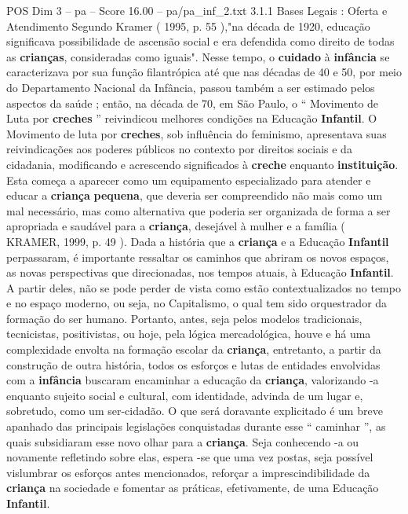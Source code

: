 \begin{textsample}{POS Dim 3 – pa – Score 16.00 – pa/pa\_inf\_2.txt}  \label{ex:f3_pos_234}
3.1.1 Bases Legais : Oferta e Atendimento Segundo Kramer ( 1995, p. 55 ),"na década de 1920, educação significava possibilidade de ascensão social e era defendida como direito de todas as \textbf{crianças}, consideradas como iguais".
Nesse tempo, o \textbf{cuidado} à \textbf{infância} se caracterizava por sua função filantrópica até que nas décadas de 40 e 50, por meio do Departamento Nacional da Infância, passou também a ser estimado pelos aspectos da saúde ; então, na década de 70, em São Paulo, o “ Movimento de Luta por \textbf{creches} ” reivindicou melhores condições na Educação \textbf{Infantil}.
O Movimento de luta por \textbf{creches}, sob influência do feminismo, apresentava suas reivindicações aos poderes públicos no contexto por direitos sociais e da cidadania, modificando e acrescendo significados à \textbf{creche} enquanto \textbf{instituição}.
Esta começa a aparecer como um equipamento especializado para atender e educar a \textbf{criança} \textbf{pequena}, que deveria ser compreendido não mais como um mal necessário, mas como alternativa que poderia ser organizada de forma a ser apropriada e saudável para a \textbf{criança}, desejável à mulher e a família ( KRAMER, 1999, p. 49 ).
Dada a história que a \textbf{criança} e a Educação \textbf{Infantil} perpassaram, é importante ressaltar os caminhos que abriram os novos espaços, as novas perspectivas que direcionadas, nos tempos atuais, à Educação \textbf{Infantil}.
A partir deles, não se pode perder de vista como estão contextualizados no tempo e no espaço moderno, ou seja, no Capitalismo, o qual tem sido orquestrador da formação do ser humano.
Portanto, antes, seja pelos modelos tradicionais, tecnicistas, positivistas, ou hoje, pela lógica mercadológica, houve e há uma complexidade envolta na formação escolar da \textbf{criança}, entretanto, a partir da construção de outra história, todos os esforços e lutas de entidades envolvidas com a \textbf{infância} buscaram encaminhar a educação da \textbf{criança}, valorizando -a enquanto sujeito social e cultural, com identidade, advinda de um lugar e, sobretudo, como um ser-cidadão.
O que será doravante explicitado é um breve apanhado das principais legislações conquistadas durante esse “ caminhar ”, as quais subsidiaram esse novo olhar para a \textbf{criança}.
Seja conhecendo -a ou novamente refletindo sobre elas, espera -se que uma vez postas, seja possível vislumbrar os esforços antes mencionados, reforçar a imprescindibilidade da \textbf{criança} na sociedade e fomentar as práticas, efetivamente, de uma Educação \textbf{Infantil}.

\end{textsample}
